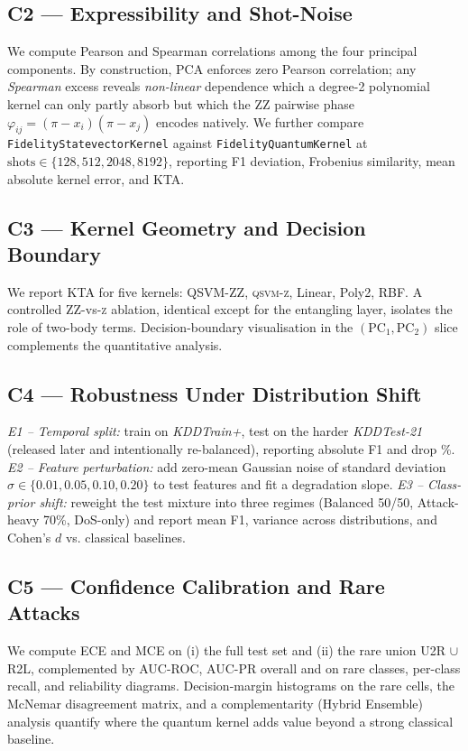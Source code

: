 \documentclass[journal]{IEEEtran}
\newcommand{\ZZ}{\textsc{ZZ}}
\newcommand{\QSVM}{QSVM-\ZZ}
\begin{document}
  \subsection{C2 --- Expressibility and Shot-Noise}
  We compute Pearson and Spearman correlations among the four
  principal components. By construction, PCA enforces zero Pearson
  correlation; any \emph{Spearman} excess reveals \emph{non-linear}
  dependence which a degree-2 polynomial kernel can only partly
  absorb but which the \ZZ{} pairwise phase
  $\varphi_{ij}=(\pi-x_i)(\pi-x_j)$ encodes natively.
  We further compare \texttt{FidelityStatevectorKernel} against
  \texttt{FidelityQuantumKernel} at $\mathrm{shots}\in
  \{128,512,2048,8192\}$, reporting F1 deviation, Frobenius similarity,
  mean absolute kernel error, and KTA.

  \subsection{C3 --- Kernel Geometry and Decision Boundary}
  We report KTA \cite{cristianini2002kta} for five kernels: \QSVM{},
  \textsc{qsvm-z}, Linear, Poly2, RBF. A controlled \ZZ{}-vs-\textsc{z}
  ablation, identical except for the entangling layer, isolates the
  role of two-body terms. Decision-boundary visualisation in the
  $(\mathrm{PC}_1,\mathrm{PC}_2)$ slice complements the quantitative
  analysis.

  \subsection{C4 --- Robustness Under Distribution Shift}
  \emph{E1 -- Temporal split:} train on \textit{KDDTrain+}, test on the
  harder \textit{KDDTest-21} (released later and intentionally
  re-balanced), reporting absolute F1 and drop \%.
  \emph{E2 -- Feature perturbation:} add zero-mean Gaussian noise of
  standard deviation $\sigma\in\{0.01,0.05,0.10,0.20\}$ to test
  features and fit a degradation slope.
  \emph{E3 -- Class-prior shift:} reweight the test mixture into three
  regimes (Balanced 50/50, Attack-heavy 70\%, DoS-only) and report
  mean F1, variance across distributions, and Cohen's $d$ vs.
  classical baselines.

  \subsection{C5 --- Confidence Calibration and Rare Attacks}
  We compute ECE and MCE on (i) the full test set and (ii) the rare
  union U2R $\cup$ R2L, complemented by AUC-ROC, AUC-PR overall and
  on rare classes, per-class recall, and reliability diagrams.
  Decision-margin histograms on the rare cells, the McNemar
  disagreement matrix, and a complementarity (Hybrid Ensemble) analysis
  quantify where the quantum kernel adds value beyond a strong
  classical baseline.
\end{document}
